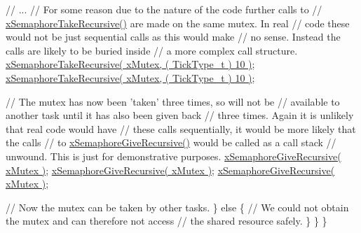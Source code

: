 \begin{DoxyPre}           // ...
           // For some reason due to the nature of the code further calls to
        // \hyperlink{vendor_2ceedling_2plugins_2freertos_2src_2freertos_2include_2semphr_8h_ad395f4bba51eea6af3397d72bc079e4d}{xSemaphoreTakeRecursive()} are made on the same mutex.  In real
        // code these would not be just sequential calls as this would make
        // no sense.  Instead the calls are likely to be buried inside
        // a more complex call structure.
           \hyperlink{vendor_2ceedling_2plugins_2freertos_2src_2freertos_2include_2semphr_8h_ad395f4bba51eea6af3397d72bc079e4d}{xSemaphoreTakeRecursive( xMutex, ( TickType\_t ) 10 )};
           \hyperlink{vendor_2ceedling_2plugins_2freertos_2src_2freertos_2include_2semphr_8h_ad395f4bba51eea6af3397d72bc079e4d}{xSemaphoreTakeRecursive( xMutex, ( TickType\_t ) 10 )};\end{DoxyPre}



\begin{DoxyPre}           // The mutex has now been 'taken' three times, so will not be
        // available to another task until it has also been given back
        // three times.  Again it is unlikely that real code would have
        // these calls sequentially, it would be more likely that the calls
        // to \hyperlink{vendor_2ceedling_2plugins_2freertos_2src_2freertos_2include_2semphr_8h_a398d66b17856c22dd49d39aaac42f105}{xSemaphoreGiveRecursive()} would be called as a call stack
        // unwound.  This is just for demonstrative purposes.
           \hyperlink{vendor_2ceedling_2plugins_2freertos_2src_2freertos_2include_2semphr_8h_a398d66b17856c22dd49d39aaac42f105}{xSemaphoreGiveRecursive( xMutex )};
        \hyperlink{vendor_2ceedling_2plugins_2freertos_2src_2freertos_2include_2semphr_8h_a398d66b17856c22dd49d39aaac42f105}{xSemaphoreGiveRecursive( xMutex )};
        \hyperlink{vendor_2ceedling_2plugins_2freertos_2src_2freertos_2include_2semphr_8h_a398d66b17856c22dd49d39aaac42f105}{xSemaphoreGiveRecursive( xMutex )};\end{DoxyPre}



\begin{DoxyPre}        // Now the mutex can be taken by other tasks.
       \}
       else
       \{
           // We could not obtain the mutex and can therefore not access
           // the shared resource safely.
       \}
   \}
\}
\end{DoxyPre}
 